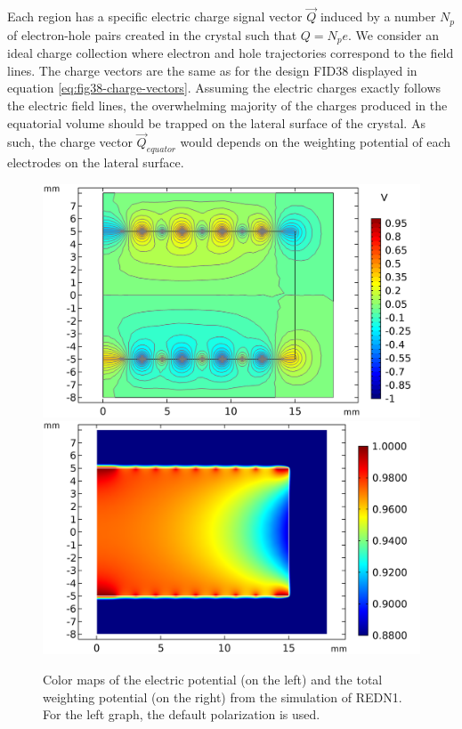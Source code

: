 Each region has a specific electric charge signal vector $\vec{Q}$ induced by a number $N_p$ of electron-hole pairs created in the crystal such that $Q = N_p e$. We consider an ideal charge collection where electron and hole trajectories correspond to the field lines. The charge vectors are the same as for the design FID38 displayed in equation \ref{eq:fig38-charge-vectors}.
Assuming the electric charges exactly follows the electric field lines, the overwhelming majority of the charges produced in the equatorial volume should be trapped on the lateral surface of the crystal. As such, the charge vector $\vec{Q}_{equator}$ would depends on the weighting potential of each electrodes on the lateral surface.

\begin{figure}
\centering
\includegraphics[scale=0.5]{Figures/ElectrodesExperimental/potential_redn1.png}
\includegraphics[scale=0.5]{Figures/ElectrodesExperimental/twp_redn1.png}
\caption{Color maps of the electric potential (on the left) and the total weighting potential (on the right) from the simulation of REDN1. For the left graph, the default polarization is used.}
\label{fig:redn1-potential-twp}
\end{figure}

